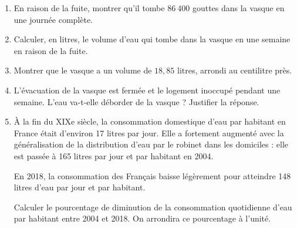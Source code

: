 \begin{enumerate}[itemsep=1em]
\item En raison de la fuite, montrer qu'il tombe $86~400$ gouttes dans la vasque en une journée complète.
\item Calculer, en litres, le volume d'eau qui tombe dans la vasque en une semaine en raison de la fuite.
\item Montrer que le vasque a un volume de $18,85$ litres, arrondi au centilitre près.
\item L'évacuation de la vasque est fermée et le logement inoccupé pendant une semaine. L'eau va-t-elle déborder de la vasque ? Justifier la réponse.
\item À la fin du XIXe siècle, la consommation domestique d'eau par habitant en France était d'environ 17 litres par jour. Elle a fortement augmenté avec la généralisation de la distribution d'eau par le robinet dans les domiciles : elle est passée à 165 litres par jour et par habitant en 2004.

En 2018, la consommation des Français baisse légèrement pour atteindre 148 litres d'eau par jour et par habitant.

Calculer le pourcentage de diminution de la consommation quotidienne d'eau par habitant entre 2004 et 2018. On arrondira ce pourcentage à l'unité.

\end{enumerate}

